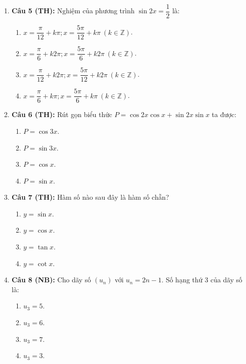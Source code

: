 \documentclass[12pt, a4paper]{article}
\begin{document}
\begin{enumerate}[leftmargin=0.8cm]
    \item \textbf{Câu 5 (TH):} Nghiệm của phương trình $\sin 2x = \dfrac{1}{2}$ là:
    \begin{enumerate}[label=\Alph*., leftmargin=0.8cm]
        \item $x = \dfrac{\pi}{12} + k\pi; x = \dfrac{5\pi}{12} + k\pi \ (k \in \mathbb{Z})$.
        \item $x = \dfrac{\pi}{6} + k2\pi; x = \dfrac{5\pi}{6} + k2\pi \ (k \in \mathbb{Z})$.
        \item $x = \dfrac{\pi}{12} + k2\pi; x = \dfrac{5\pi}{12} + k2\pi \ (k \in \mathbb{Z})$.
        \item $x = \dfrac{\pi}{6} + k\pi; x = \dfrac{5\pi}{6} + k\pi \ (k \in \mathbb{Z})$.
    \end{enumerate}

    \item \textbf{Câu 6 (TH):} Rút gọn biểu thức $P = \cos 2x \cos x + \sin 2x \sin x$ ta được:
    \begin{enumerate}[label=\Alph*., leftmargin=0.8cm]
        \item $P = \cos 3x$.
        \item $P = \sin 3x$.
        \item $P = \cos x$.
        \item $P = \sin x$.
    \end{enumerate}

    \item \textbf{Câu 7 (TH):} Hàm số nào sau đây là hàm số chẵn?
    \begin{enumerate}[label=\Alph*., leftmargin=0.8cm]
        \item $y = \sin x$.
        \item $y = \cos x$.
        \item $y = \tan x$.
        \item $y = \cot x$.
    \end{enumerate}

    \item \textbf{Câu 8 (NB):} Cho dãy số $(u_n)$ với $u_n = 2n - 1$. Số hạng thứ 3 của dãy số là:
    \begin{enumerate}[label=\Alph*., leftmargin=0.8cm]
        \item $u_3 = 5$.
        \item $u_3 = 6$.
        \item $u_3 = 7$.
        \item $u_3 = 3$.
    \end{enumerate}


\end{enumerate}
\end{document}
